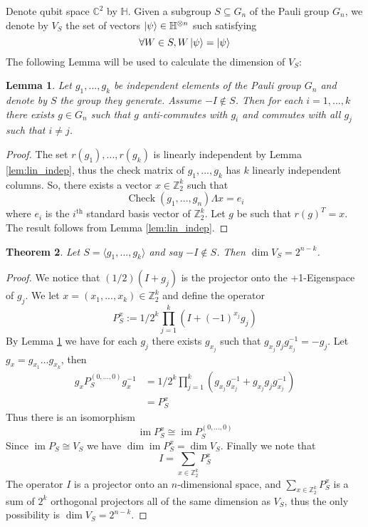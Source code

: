 \documentclass[12pt]{article}
\theoremstyle{plain}
\newtheorem{thm}{Theorem}[subsection] %
\newtheorem{lemma}[thm]{Lemma}
\theoremstyle{definition}
\newcommand{\bb}[1]{\mathbb{#1}}
\begin{document}
	Denote qubit space $\bb{C}^2$ by $\bb{H}$. Given a subgroup $S \subseteq G_n$ of the Pauli group $G_n$, we denote by $V_S$ the set of vectors $\ket{\psi} \in \bb{H}^{\otimes n}$ such satisfying
	\begin{equation}
		\forall W \in S, W\ket{\psi} = \ket{\psi}
	\end{equation}
	The following Lemma will be used to calculate the dimension of $V_S$:
	\begin{lemma}\label{lem:anti_commutes}
		Let $g_1,...,g_k$ be independent elements of the Pauli group $G_n$ and denote by $S$ the group they generate. Assume $-I \not\in S$. Then for each $i = 1,...,k$ there exists $g \in G_n$ such that $g$ anti-commutes with $g_i$ and commutes with all $g_j$ such that $i \neq j$.
	\end{lemma}
	\begin{proof}
		The set $r(g_1),...,r(g_k)$ is linearly independent by Lemma \ref{lem:lin_indep}, thus the check matrix of $g_1,...,g_k$ has $k$ linearly independent columns. So, there exists a vector $x \in \bb{Z}_2^k$ such that
		\begin{equation}
			\operatorname{Check}(g_1,...,g_n)\Lambda x = e_i
		\end{equation}
		where $e_i$ is the $i^{\text{th}}$ standard basis vector of $\bb{Z}_2^k$. Let $g$ be such that $r(g)^T = x$. The result follows from Lemma \ref{lem:lin_indep}.
	\end{proof}
	\begin{thm}
		Let $S = \langle g_1,...,g_k\rangle$ and say $-I \not\in S$. Then $\operatorname{dim}V_S = 2^{n - k}$.
	\end{thm}
	\begin{proof}
		We notice that $(1/2)(I + g_j)$ is the projector onto the +1-Eigenspace of $g_j$. We let $x = (x_1,...,x_k) \in \bb{Z}_2^k$ and define the operator
		\begin{equation}
			P_S^x := 1/2^{k}\prod_{j = 1}^k(I + (-1)^{x_{j}}g_j)
		\end{equation}
		By Lemma \ref{lem:anti_commutes} we have for each $g_j$ there exists $g_{x_j}$ such that $g_{x_j}g_j g_{x_j}^{-1} = -g_j$. Let $g_x = g_{x_1}\hdots g_{x_k}$, then
		\begin{align*}
			g_xP_S^{(0,...,0)} g_x^{-1} &= 1/2^k\prod_{j = 1}^k (g_{x_j}g_{x_j}^{-1} + g_{x_j} g_{j}g_{x_j}^{-1})\\
			&= P_S^x
		\end{align*}
		Thus there is an isomorphism
		\begin{equation}
			\operatorname{im}P_S^x \cong \operatorname{im}P_S^{(0,...,0)}
		\end{equation}
		Since $\operatorname{im}P_S \cong V_S$ we have $\operatorname{dim}\operatorname{im}P_S^x = \operatorname{dim}V_S$. Finally we note that
		\begin{equation}
			I = \sum_{x \in \bb{Z}_2^k}P_S^x
		\end{equation}
		The operator $I$ is a projector onto an $n$-dimensional space, and $\sum_{x \in \bb{Z}_2^k}P_S^x$ is a sum of $2^k$ orthogonal projectors all of the same dimension as $V_S$, thus
		the only possibility is $\operatorname{dim}V_S = 2^{n - k}$.
	\end{proof}
\end{document}
